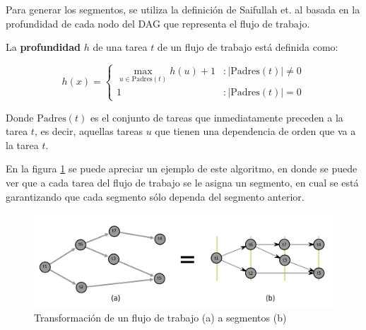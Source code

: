 Para generar los segmentos, se utiliza la definición de Saifullah et. al \cite{saifullah2013multi} basada en la profundidad de cada nodo del DAG que representa el flujo de trabajo.

\begin{defn}

La \textbf{profundidad} $h$ de una tarea $t$ de un flujo de trabajo está definida como:

\begin{displaymath}
h(x) = \left\{
     \begin{array}{lr}
       \max_{u \in \text{Padres}(t) } h(u) + 1 & : | \text{Padres}(t) | \neq 0 \\
       1                                       & : | \text{Padres}(t) | = 0
     \end{array}
   \right.
\end{displaymath}

\noindent Donde $\text{Padres}(t)$ es el conjunto de tareas que inmediatamente preceden a la tarea $t$, es decir, aquellas tareas $u$ que tienen una dependencia de orden que va a la tarea $t$.
\end{defn}

En la figura \ref{fig:DAG_to_segment} se puede apreciar un ejemplo de este algoritmo, en donde se puede ver que a cada tarea del flujo de trabajo se le asigna un segmento, en cual se está garantizando que cada segmento sólo dependa del segmento anterior.

\begin{figure}
\begin{center}
\includegraphics[width=1.0\textwidth]{imagenes/DAG_to_segment.pdf}
\end{center}
\caption{Transformación de un flujo de trabajo (a) a segmentos (b)}
\label{fig:DAG_to_segment}
\end{figure}

